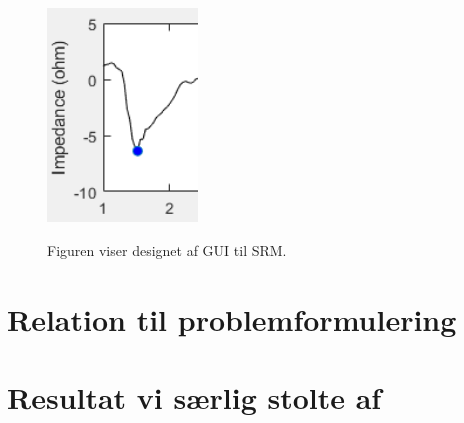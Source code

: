 \begin{figure}[H]
\centering
{\includegraphics[width=4cm]
{Figure/synkfraGUI5ohm}}
\caption{Figuren viser designet af GUI til SRM.}
\label{Fig:designGUI}
\end{figure} 

\section{Relation til problemformulering}

\section{Resultat vi særlig stolte af}


